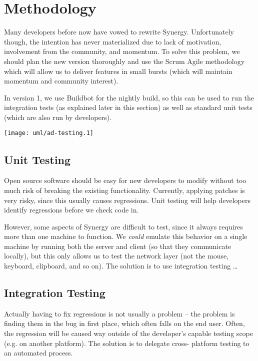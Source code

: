 \section{Methodology}

Many developers before now have vowed to rewrite Synergy. Unfortunately though,
the intention has never materialized due to lack of motivation, involvement from
the community, and momentum.
To solve this problem, we should plan the new version thoroughly and use the
Scrum Agile methodology which will allow us to deliver features in small 
bursts (which will maintain momentum and community interest).

In version 1, we use Buildbot for the nightly build, so this can be used to run
the integration tests (as explained later in this section) as well as standard 
unit tests (which are also run by developers).

\texttt{[image: uml/ad-testing.1]}

\subsection{Unit Testing}

Open source software should be easy for new developers to modify without too
much risk of breaking the existing functionality. Currently, applying patches 
is very risky, since this usually causes regressions. Unit testing will help 
developers identify regressions before we check code in.

However, some aspects of Synergy are difficult to test, since it always requires
more than one machine to function. We \textit{could} emulate this behavior on a 
single machine by running both the server and client (so that they communicate 
locally), but this only allows us to test the network layer (not the mouse,
keyboard, clipboard, and so on). The solution is to use integration testing
\ldots

\subsection{Integration Testing}

Actually having to fix regressions is not usually a problem -- the problem is
finding them in the bug in first place, which often falls on the end user. 
Often, the regression will be caused way outside of the developer's capable 
testing scope (e.g. on another platform). The solution is to delegate cross-
platform testing to an automated process.

